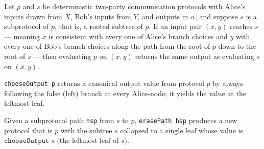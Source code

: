 \begin{lemma}
\label{CommunicationComplexity.Deterministic.Protocol.subprotocol_run_eq_of_reaches}
\leanok
{}
Let $p$ and $s$ be deterministic two-party communication protocols with Alice's inputs
drawn from $X$, Bob's inputs from $Y$, and outputs in $\alpha$, and suppose $s$ is a
subprotocol of $p$, that is, a rooted subtree of $p$. If an input pair $(x, y)$ reaches
$s$ — meaning $x$ is consistent with every one of Alice's branch choices and $y$ with
every one of Bob's branch choices along the path from the root of $p$ down to the root
of $s$ — then evaluating $p$ on $(x, y)$ returns the same output as evaluating $s$ on
$(x, y)$.
\end{lemma}

\begin{definition}
\label{CommunicationComplexity.Deterministic.Protocol.chooseOutput}
\leanok
{}
\texttt{chooseOutput p} returns a canonical output value from protocol $p$ by always following
the false (left) branch at every Alice-node; it yields the value at the leftmost leaf.
\end{definition}

\begin{definition}
\label{CommunicationComplexity.Deterministic.Protocol.erasePath}
\leanok
{}
Given a subprotocol path \texttt{hsp} from $s$ to $p$, \texttt{erasePath hsp} produces a new
protocol that is $p$ with the subtree $s$ collapsed to a single leaf whose value is
$\texttt{chooseOutput}\;s$ (the leftmost leaf of $s$).
\end{definition}

